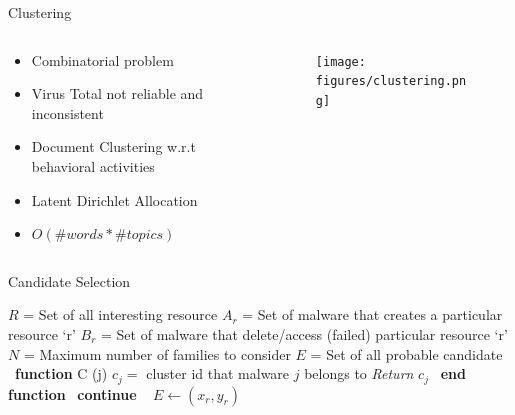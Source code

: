 \documentclass{beamer}
\begin{document}
\begin{frame}[h]{Clustering}
  \begin{columns}
    \begin{column}{5cm}
      \begin{itemize}
        \item Combinatorial problem
        \item Virus Total not reliable and inconsistent
        \item Document Clustering w.r.t behavioral activities
        \item Latent Dirichlet Allocation
        \item $O(\#words * \#topics)$
      \end{itemize}
    \end{column}
    \begin{column}{5cm}
      \begin{figure}[h]
        \centering
        \texttt{[image: figures/clustering.png]}
      \label{fig:malware_type}
      \end{figure}
    \end{column}
  \end{columns}
\end{frame}
\begin{frame}[plain]{Candidate Selection}
\begin{algorithm}[H]
  \small
  \begin{algorithmic}[1]
    \STATE$R$   = Set of all interesting resource
    \STATE$A_r$ = Set of malware that creates a particular resource `r'
    \STATE$B_r$ = Set of malware that delete/access (failed) particular resource `r'
    \STATE$N$   = Maximum number of families to consider
    \STATE$E$   = Set of all probable candidate
    \STATE\ \textbf{function} C (j)
      \STATE\hspace{\algorithmicindent} $c_j =$ cluster id that malware $j$ belongs to
      \STATE\hspace{\algorithmicindent} \textit{Return} $c_j$
    \STATE\ \textbf{end function}
        \STATE\ \textbf{continue}
      \ENDIF\
          \STATE$E\gets (x_r, y_r)$
        \ENDIF\
      \ENDFOR\
    \ENDFOR\
  \end{algorithmic}
\end{algorithm}
\end{frame}
\end{document}
